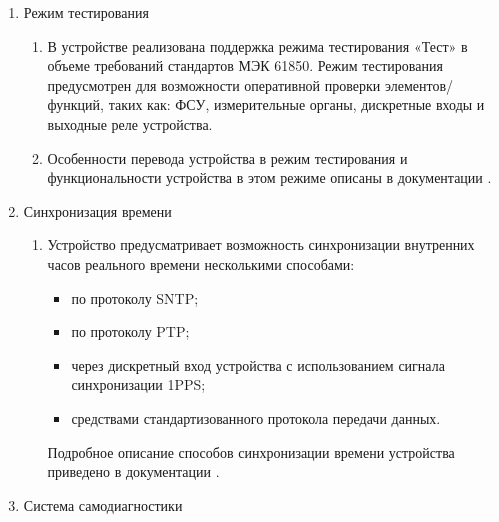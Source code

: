 \begin{enumerate}[label=\arabic{section}.\arabic{subsection}.\arabic*, labelsep=7pt, leftmargin=0pt, itemindent=60pt, align=left]
\begin{enumerate}
\end{enumerate}

\item Режим тестирования
\begin{enumerate}

\item 
В устройстве реализована поддержка режима тестирования «Тест» в объеме требований стандартов МЭК 61850.
Режим тестирования предусмотрен для возможности оперативной проверки элементов/функций, таких как: ФСУ, измерительные органы, дискретные входы и выходные реле устройства.

\item 
Особенности перевода устройства в режим тестирования и функциональности устройства в этом режиме описаны в документации \ManualUnitGeneral.

\end{enumerate}

\item Синхронизация времени
\begin{enumerate}

\item
Устройство предусматривает возможность синхронизации внутренних часов реального времени несколькими способами:
\begin{itemize}
\item по протоколу SNTP;
\item по протоколу PTP;
\item через дискретный вход устройства с использованием сигнала синхронизации 1PPS;
\item {средствами стандартизованного протокола передачи данных.}
\end{itemize}
Подробное описание способов синхронизации времени устройства приведено в документации \ManualUnitGeneral.

\end{enumerate}

\item Система самодиагностики
\begin{enumerate}


\end{enumerate}
\end{enumerate}
